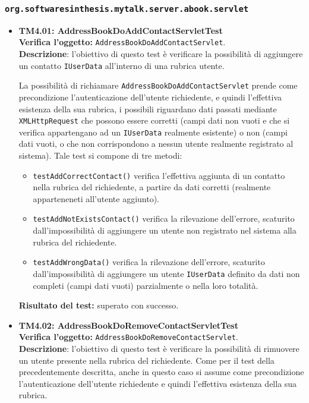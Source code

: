 \subsubsection{\texttt{org.softwaresinthesis.mytalk.server.abook.servlet}}
\begin{itemize}
\item \textbf{TM4.01: AddressBookDoAddContactServletTest}\\
\textbf{Verifica l'oggetto:} \texttt{AddressBookDoAddContactServlet}.\\
\textbf{Descrizione}: l'obiettivo di questo test è verificare la possibilità di aggiungere un contatto \texttt{IUserData} all'interno di una rubrica utente.

La possibilità di richiamare \texttt{AddressBookDoAddContactServlet} prende come precondizione l'autenticazione dell'utente richiedente, e quindi l'effettiva esistenza della sua rubrica, i possibili  riguardano dati passati mediante \texttt{XMLHttpRequest} che possono essere corretti (campi dati non vuoti e che si verifica appartengano ad un \texttt{IUserData} realmente esistente) o non (campi dati vuoti, o che non corrispondono a nessun utente realmente registrato al sistema).
Tale test si compone di tre metodi:
\begin{itemize}
\item \texttt{testAddCorrectContact()} verifica l'effettiva aggiunta di un contatto nella rubrica del richiedente, a partire da dati corretti (realmente apparteneneti all'utente aggiunto).
\item \texttt{testAddNotExistsContact()} verifica la rilevazione dell'errore, scaturito dall'impossibilità di aggiungere un utente non registrato nel sistema alla rubrica del richiedente.
\item \texttt{testAddWrongData()} verifica la rilevazione dell'errore, scaturito dall'impossibilità di aggiungere un utente \texttt{IUserData} definito da dati non completi (campi dati vuoti) parzialmente o nella loro totalità.
\end{itemize}
\textbf{Risultato del test:} superato con successo.


\item \textbf{TM4.02: AddressBookDoRemoveContactServletTest}\\
\textbf{Verifica l'oggetto:} \texttt{AddressBookDoRemoveContactServlet}.\\
\textbf{Descrizione}: l'obiettivo di questo test è verificare la possibilità di rimuovere un utente presente nella rubrica del richiedente. Come per il test della  precedentemente descritta, anche in questo caso si assume come precondizione l'autenticazione dell'utente richiedente e quindi l'effettiva esistenza della sua rubrica.


\end{itemize}
